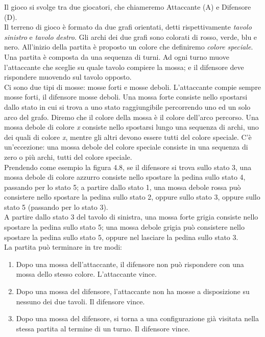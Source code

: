 \documentclass[a4paper,11pt,twoside,openright]{report}
\begin{document}
Il gioco si svolge tra due giocatori, che chiameremo Attaccante (A) e Difensore (D).\\
Il terreno di gioco è formato da due grafi orientati, detti rispettivamente \textit{tavolo sinistro} e \textit{tavolo destro}. Gli archi dei due grafi sono colorati di rosso, verde, blu e nero. All'inizio della
partita è proposto un colore che definiremo \textit{colore speciale}.\\
Una partita è composta da una sequenza di turni. Ad ogni turno muove l’attaccante che sceglie su quale tavolo compiere la mossa; e il difensore deve rispondere muovendo sul tavolo opposto.\\
Ci sono due tipi di mosse: mosse forti e mosse deboli. L’attaccante compie sempre mosse forti, il difensore mosse deboli. Una mossa forte consiste nello spostarsi dallo stato in cui si trova a uno stato raggiungibile percorrendo uno ed un solo arco del grafo. Diremo che il colore della mossa è il colore dell’arco percorso. Una mossa debole di colore \textit{x} consiste nello spostarsi lungo una sequenza di archi, uno dei quali di colore \textit{x}, mentre gli altri devono essere tutti del colore speciale. C'è un’eccezione: una mossa debole del colore speciale consiste in una sequenza di zero o più archi, tutti del colore speciale.\\
Prendendo come esempio la figura 4.8, se il difensore si trova sullo stato 3, una mossa debole di colore azzurro consiste nello spostare la pedina sullo stato 4, passando
per lo stato 5; a partire dallo stato 1, una mossa debole rossa può consistere nello spostare la pedina sullo stato 2, oppure sullo stato 3, oppure sullo stato 5 (passando
per lo stato 3).\\
A partire dallo stato 3 del tavolo di sinistra, una mossa forte grigia consiste nello spostare la pedina sullo stato 5; una mossa debole grigia può consistere nello spostare
la pedina sullo stato 5, oppure nel lasciare la pedina sullo stato 3.\\

La partita può terminare in tre modi:

\begin{enumerate}
\item Dopo una mossa dell’attaccante, il difensore non può rispondere con una mossa dello stesso colore. L’attaccante vince.

\item Dopo una mossa del difensore, l’attaccante non ha mosse a disposizione su nessuno dei due tavoli. Il difensore vince.

\item Dopo una mossa del difensore, si torna a una configurazione già visitata nella stessa partita al termine di un turno. Il difensore vince.
\end{enumerate}
\end{document}
